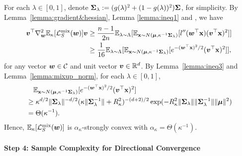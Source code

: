 For each $\lambda \in [0,1]$, denote ${\bm{\Sigma}}_\lambda : = (g(\lambda)^2 + (1-g(\lambda))^2) {\bm{\Sigma}}$, for simplicity. By Lemma~\ref{lemma:gradient&hessian}, Lemma \ref{lemma:ineq1} and , we have 
\begin{align*}
    {\bm{v}}^\top \nabla^2_{\bm{w}} \mathbb{E}_\kappa[\mathcal{L}_S^\mathrm{mix} ({\bm{w}})] {\bm{v}} &\geq \frac{n-1}{2n} \mathbb{E}_{\lambda \sim \Lambda}[\mathbb{E}_{{\mathbf{x}} \sim N({\bm{\mu}}, \kappa^{-1} {\bm{\Sigma}}_\lambda)}[l''({\bm{w}}^\top {\mathbf{x}})({\bm{v}}^\top {\mathbf{x}})^2]]\\
    &\geq \frac{1}{16} \mathbb{E}_{\lambda \sim \Lambda}[\mathbb{E}_{{\mathbf{x}} \sim N({\bm{\mu}}, \kappa^{-1} {\bm{\Sigma}}_\lambda)}[e^{-({\bm{w}}^\top {\mathbf{x}})^2/2}({\bm{v}}^\top {\mathbf{x}})^2]],
\end{align*}
for any vector ${\bm{w}}\in\mathcal{C}$ and unit vector ${\bm{v}} \in \mathbb{R}^d$. By Lemma~\ref{lemma:ineq3} and Lemma~\ref{lemma:mixup_norm}, for each $\lambda \in [0,1]$, 
\begin{align*}
&\quad \mathbb{E}_{{\mathbf{x}} \sim N({\bm{\mu}}, \kappa^{-1} {\bm{\Sigma}}_\lambda)}[e^{-({\bm{w}}^\top {\mathbf{x}})^2/2}({\bm{v}}^\top {\mathbf{x}})^2]\\
&\geq \kappa^{d/2} \lVert {\bm{\Sigma}}_\lambda \rVert^{-d/2} (\kappa\lVert {\bm{\Sigma}}_\lambda^{-1} \rVert + R_\kappa^2)^{-(d+2)/2} \exp(-R_\kappa^2 \lVert {\bm{\Sigma}}_\lambda \rVert \lVert {\bm{\Sigma}}_\lambda^{-1} \rVert \lVert {\bm{\mu}}\rVert^2)\\
&= \Theta (\kappa^{-1}).
\end{align*}
Hence, $\mathbb{E}_\kappa[\mathcal{L}_S^\mathrm{mix}({\bm{w}})]$ is $\alpha_\kappa $-strongly convex with $\alpha_\kappa = \Theta(\kappa^{-1})$.


\paragraph{Step 4: Sample Complexity for Directional Convergence} \quad

